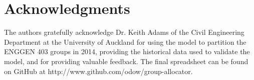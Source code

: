 \documentclass[12pt]{ORSNZ}
\begin{document}
\section*{Acknowledgments}
The authors gratefully acknowledge Dr. Keith Adams of the Civil Engineering Department at the University of Auckland for using the model to partition the ENGGEN 403 groups in 2014, providing the historical data used to validate the model, and for providing valuable feedback. The final spreadsheet can be found on GitHub at http://www.github.com/odow/group-allocator.


\end{document}
